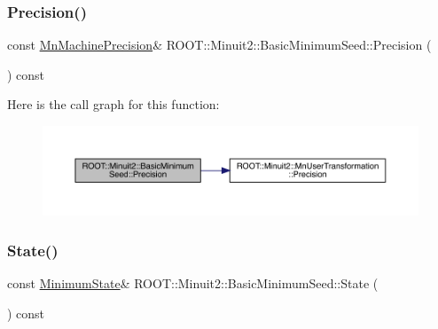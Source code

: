 \subsubsection{\texorpdfstring{Precision()}{Precision()}\hspace{0.1cm}{\footnotesize\ttfamily [3/3]}}
{\footnotesize\ttfamily const \mbox{\hyperlink{classROOT_1_1Minuit2_1_1MnMachinePrecision}{Mn\+Machine\+Precision}}\& R\+O\+O\+T\+::\+Minuit2\+::\+Basic\+Minimum\+Seed\+::\+Precision (\begin{DoxyParamCaption}{ }\end{DoxyParamCaption}) const\hspace{0.3cm}{\ttfamily [inline]}}

Here is the call graph for this function\+:
\nopagebreak
\begin{figure}[H]
\begin{center}
\leavevmode
\includegraphics[width=350pt]{de/d50/classROOT_1_1Minuit2_1_1BasicMinimumSeed_af06c66e8851f7314915e01e0bedb200c_cgraph}
\end{center}
\end{figure}
\mbox{\label{classROOT_1_1Minuit2_1_1BasicMinimumSeed_a92e671b9a963d83076238c2e2b283e7c}} 
\subsubsection{\texorpdfstring{State()}{State()}\hspace{0.1cm}{\footnotesize\ttfamily [1/3]}}
{\footnotesize\ttfamily const \mbox{\hyperlink{classROOT_1_1Minuit2_1_1MinimumState}{Minimum\+State}}\& R\+O\+O\+T\+::\+Minuit2\+::\+Basic\+Minimum\+Seed\+::\+State (\begin{DoxyParamCaption}{ }\end{DoxyParamCaption}) const\hspace{0.3cm}{\ttfamily [inline]}}

\mbox{\label{classROOT_1_1Minuit2_1_1BasicMinimumSeed_a92e671b9a963d83076238c2e2b283e7c}} 
